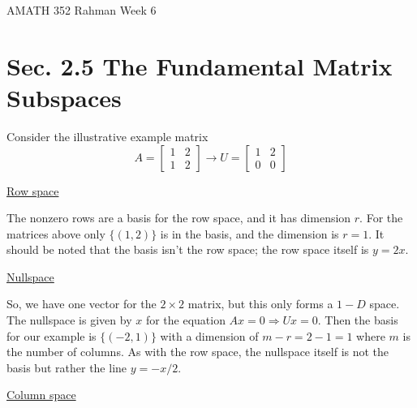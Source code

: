 \documentclass[reqno]{amsart}
\theoremstyle{definition}
\begin{document}
\begin{flushleft}
{\sc \Large AMATH 352 Rahman} \hfill Week 6
\bigskip
\end{flushleft}

\newcommand{\R}{\mathbb{R}}
\newcommand{\N}{\mathbb{N}}
\newcommand{\Z}{\mathbb{Z}}
\newcommand{\Q}{\mathbb{Q}}
\renewcommand{\CancelColor}{\color{red}}
\newcommand{\?}{\stackrel{?}{=}}
\renewcommand{\varphi}{\phi}
\newcommand{\card}{\text{Card}}
\newcommand{\bigzero}{\text{\Huge 0}}
\newcommand{\curvearrowdown}{{\color{red}\rotatebox{90}{$\curvearrowleft$}}}
\newcommand{\curvearrowup}{{\color{red}\rotatebox{90}{$\curvearrowright$}}}

\newcommand*\circled[1]{\color{red}\tikz[baseline=(char.base)]{
            \node[shape=circle,draw,inner sep=2pt] (char) {#1};}}



\section*{Sec. 2.5  The Fundamental Matrix Subspaces}

Consider the illustrative example matrix
%
\begin{equation*}
A = \begin{bmatrix}
1 & 2\\
1 & 2
\end{bmatrix} \longrightarrow U = \begin{bmatrix}
1 & 2\\
0 & 0
\end{bmatrix}
\end{equation*}

\underline{Row space}

The nonzero rows are a basis for the row space, and it has dimension $r$.  For the matrices above only
$\{(1, 2)\}$ is in the basis, and the dimension is $r=1$.  It should be noted that the basis isn't the row space;
the row space itself is $y = 2x$.

\underline{Nullspace}

So, we have one vector for the $2 \times 2$ matrix, but this only forms a $1-D$ space.
The nullspace is given by $x$ for the equation $Ax = 0 \Rightarrow Ux = 0$.  Then the basis for our
example is $\{(-2, 1)\}$ with a dimension of $m - r = 2 - 1 = 1$ where $m$ is the number of columns.
As with the row space, the nullspace itself is not the basis but rather the line $y = -x/2$.

\underline{Column space}
\end{document}
